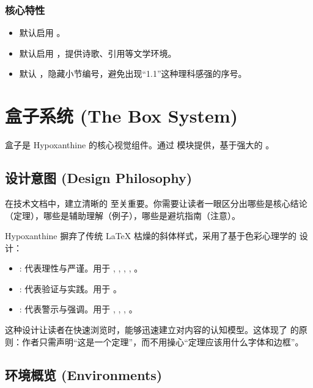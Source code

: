 \documentclass[
    outputdir=build,
    colorscheme=Tech,
    shorthand=true,
    code=true,
    fontset=lit
]{Hypo-Note}
\begin{document}
\subsection{核心特性}
\begin{itemize}
    \item 默认启用 。
    \item 默认启用 ，提供诗歌、引用等文学环境。
    \item 默认 ，隐藏小节编号，避免出现“1.1”这种理科感强的序号。
\end{itemize}

\chapter{盒子系统 (The Box System)}

盒子是 Hypoxanthine 的核心视觉组件。通过  模块提供，基于强大的 。

\section{设计意图 (Design Philosophy)}

在技术文档中，建立清晰的  至关重要。你需要让读者一眼区分出哪些是核心结论（定理），哪些是辅助理解（例子），哪些是避坑指南（注意）。

Hypoxanthine 摒弃了传统 LaTeX  枯燥的斜体样式，采用了基于色彩心理学的  设计：

\begin{itemize}
    \item {}: 代表理性与严谨。用于 , , , , 。
    \item {}: 代表验证与实践。用于 。
    \item {}: 代表警示与强调。用于 , , , 。
\end{itemize}

这种设计让读者在快速浏览时，能够迅速建立对内容的认知模型。这体现了  的原则：作者只需声明“这是一个定理”，而不用操心“定理应该用什么字体和边框”。

\section{环境概览 (Environments)}
\end{document}
